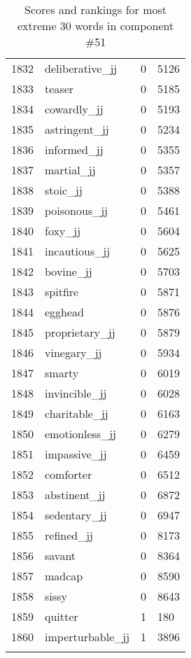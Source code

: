 \begin{longtable}[!htbp]{| rlr@{.}l |}
    1832 & deliberative\_jj & 0 & 5126 \\
    1833 & teaser & 0 & 5185 \\
    1834 & cowardly\_jj & 0 & 5193 \\
    1835 & astringent\_jj & 0 & 5234 \\
    1836 & informed\_jj & 0 & 5355 \\
    1837 & martial\_jj & 0 & 5357 \\
    1838 & stoic\_jj & 0 & 5388 \\
    1839 & poisonous\_jj & 0 & 5461 \\
    1840 & foxy\_jj & 0 & 5604 \\
    1841 & incautious\_jj & 0 & 5625 \\
    1842 & bovine\_jj & 0 & 5703 \\
    1843 & spitfire & 0 & 5871 \\
    1844 & egghead & 0 & 5876 \\
    1845 & proprietary\_jj & 0 & 5879 \\
    1846 & vinegary\_jj & 0 & 5934 \\
    1847 & smarty & 0 & 6019 \\
    1848 & invincible\_jj & 0 & 6028 \\
    1849 & charitable\_jj & 0 & 6163 \\
    1850 & emotionless\_jj & 0 & 6279 \\
    1851 & impassive\_jj & 0 & 6459 \\
    1852 & comforter & 0 & 6512 \\
    1853 & abstinent\_jj & 0 & 6872 \\
    1854 & sedentary\_jj & 0 & 6947 \\
    1855 & refined\_jj & 0 & 8173 \\
    1856 & savant & 0 & 8364 \\
    1857 & madcap & 0 & 8590 \\
    1858 & sissy & 0 & 8643 \\
    1859 & quitter & 1 & 180 \\
    1860 & imperturbable\_jj & 1 & 3896 \\
    \hline
    \caption{Scores and rankings for most extreme 30 words in component \#51} \\
\end{longtable}
